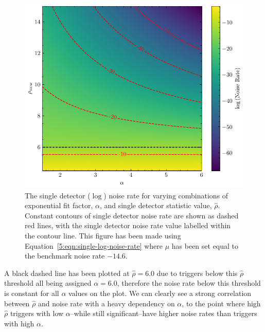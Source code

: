 %
\begin{figure}
    \centering
    \includegraphics[width=1\textwidth]{images/5_pycbclive/plots/lognoise_alpha_snr.pdf}
    \caption{The single detector ($\log$) noise rate for varying combinations of exponential fit factor, $\alpha$, and single detector statistic value, $\hat{\rho}$. Constant contours of single detector noise rate are shown as dashed red lines, with the single detector noise rate value labelled within the contour line. This figure has been made using Equation~\ref{5:eqn:single-log-noise-rate} where $\mu$ has been set equal to the benchmark noise rate $-14.6$.}
    \label{5:fig:log-noise-static-rate}
\end{figure}
%
A black dashed line has been plotted at $\hat{\rho} = 6.0$ due to triggers below this $\hat{\rho}$ threshold all being assigned $\alpha = 6.0$, therefore the noise rate below this threshold is constant for all $\alpha$ values on the plot. We can clearly see a strong correlation between $\hat{\rho}$ and noise rate with a heavy dependency on $\alpha$, to the point where high $\hat{\rho}$ triggers with low $\alpha$--while still significant--have higher noise rates than triggers with high $\alpha$.


